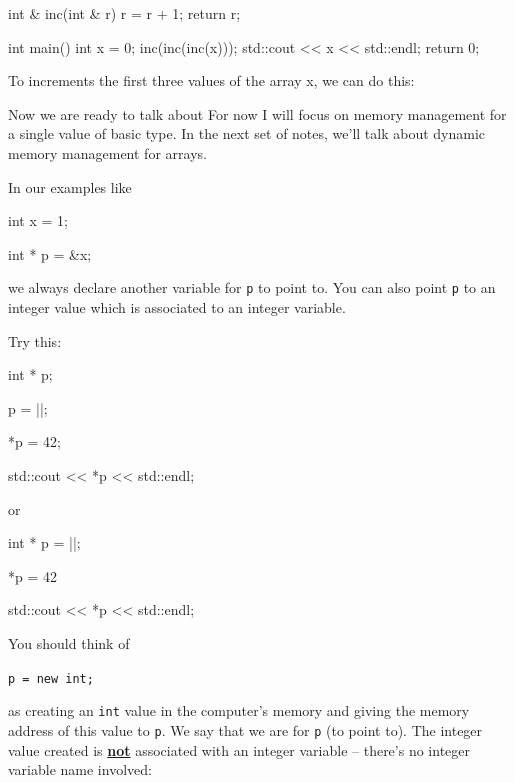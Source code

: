 \begin{consolethree}[escapeinside=||]
int & inc(int & r)
{
    r = r + 1;
    return r;
}

int main()
{
    int x = 0;
    inc(inc(inc(x)));
    std::cout << x << std::endl;
    return 0;
}
\end{consolethree}



To increments the first three values of the array x, we can do this:

\begin{consolethree}[escapeinside=||]
int index = 0;

int x[] = {3, 5, 7, 9, 2);

inc(inc(inc(&index, x), x), x); 
\end{consolethree}
\newpage{}

Now we are ready to talk about  For now I will focus on memory management for a single value of basic type. In the next set of notes, we'll talk about dynamic memory management for arrays.

In our examples like

\begin{consolethree}[escapeinside=||]
int x = 1;

int * p = &x;
\end{consolethree}

we always declare another variable for \texttt{p} to point to. You can also point \texttt{p} to an integer value which is  associated to an integer variable.

Try this:

\begin{consolethree}[escapeinside=||]
int * p;

p = ||;

*p = 42;

std::cout << *p << std::endl;
\end{consolethree}
or

\begin{consolethree}[escapeinside=||]
int * p = ||;

*p = 42

std::cout << *p << std::endl;
\end{consolethree}
You should think of
\begin{center}
\texttt{p = new int;}
\end{center}
as creating an \texttt{int} value  in the computer's memory and giving the memory address of this value to \texttt{p}. We say that we are  for \texttt{p} (to point to). The integer value created is \underline{\textbf{not}} associated with an integer variable -- there's no integer variable name involved:

